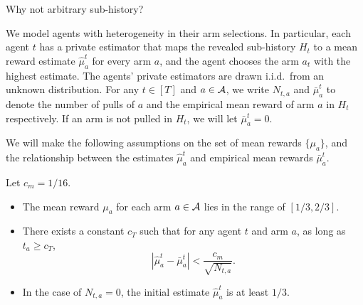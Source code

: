 \iffalse
\begin{itemize}
\item \textbf{Full history:} We show each agent the history of all previous agents' pulls. We call this policy \ALGG. 
\item \textbf{Unbiased sub-history:} We show each agent only a subset of history. The subsets are pre-determined before any arms are pulled.  
\item \textbf{Info graph:} All the recommendation policies in this paper can be described by an undirected transitive graph with $T$ nodes. We call it the info graph. The $T$ nodes in the graph represent the $T$ agents. If there is an edge between node $u$ and $v$ for $u < v$, it means the history of agent $u$ is shown to agent $v$.
\end{itemize}
\fi

\begin{remark}
  Why not arbitrary sub-history? 
\end{remark}

 We model agents with heterogeneity in their
arm selections. In particular, each agent $t$ has a private estimator
that maps the revealed sub-history $H_t$ to a mean reward estimate
$\hat{\mu}_a^t$ for every arm $a$, and the agent chooses the arm $a_t$
with the highest estimate. The agents' private estimators are drawn
i.i.d.~from an unknown distribution. For any $t\in[T]$ and $a\in \mathcal{A}$,
we write $N_{t, a}$ and $\bar{\mu}_a^t$ to denote the number of pulls
of $a$ and the empirical mean reward of arm $a$ in $H_t$
respectively. If an arm is not pulled in $H_t$, we will let
$\bar{\mu}_a^t = 0$.


We will make the following assumptions on the set of mean rewards
$\{\mu_a\}$, and the relationship between the estimates $\hat \mu_a^t$
and empirical mean rewards $\bar\mu_a^t$.



\begin{assumption}
\label{ass:embehave}
Let $c_m = 1/16$. 
\begin{itemize}
\item The mean reward $\mu_a$ for each arm $a\in \mathcal{A}$ lies in the range
  of $[1/3, 2/3]$.


\item There exists a constant $c_T$ such that for any agent $t$ and
  arm $a$, as long as $t_a \geq c_T$,
\[
  \left|\hat{\mu}^t_a - \bar{\mu}^t_a \right| <
  \frac{c_m}{\sqrt{N_{t,a}}}.
\]
\item In the case of $N_{t,a} = 0$, the initial estimate
  $\hat{\mu}^t_a$ is at least $1/3$.
\end{itemize}
\end{assumption}


